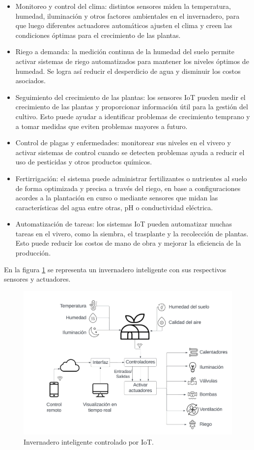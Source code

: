 \begin{itemize}
	\item Monitoreo y control del clima: distintos sensores miden la temperatura, humedad, iluminación y otros factores ambientales en el invernadero, para que luego diferentes actuadores automáticos ajusten el clima y creen las condiciones óptimas para el crecimiento de las plantas.

    \item Riego a demanda: la medición continua de la humedad del suelo permite activar sistemas de riego automatizados para mantener los niveles óptimos de humedad. Se logra así reducir el desperdicio de agua y disminuir los costos asociados.

    \item Seguimiento del crecimiento de las plantas: los sensores IoT pueden medir el crecimiento de las plantas y proporcionar información útil para la gestión del cultivo. Esto puede ayudar a identificar problemas de crecimiento temprano y a tomar medidas que eviten problemas mayores a futuro.

    \item Control de plagas y enfermedades: monitorear sus niveles en el vivero y activar sistemas de control cuando se detecten problemas ayuda a reducir el uso de pesticidas y otros productos químicos.
    
   \item  Fertirrigación: el sistema puede administrar fertilizantes o nutrientes al suelo de forma optimizada y precisa a través del riego, en base a configuraciones acordes a la plantación en curso o mediante sensores que midan las características del agua entre otras, pH o conductividad eléctrica.

    \item Automatización de tareas: los sistemas IoT pueden automatizar muchas tareas en el vivero, como la siembra, el trasplante y la recolección de plantas. Esto puede reducir los costos de mano de obra y mejorar la eficiencia de la producción.
\end{itemize}    

En la figura \ref{fig:imgInvernaderoInteligente} se representa un invernadero inteligente con sus respectivos sensores y actuadores.

\begin{figure}[htpb]
\centering 
\includegraphics[width=.7\textwidth]{../Figures/SmartGreenhouse.jpeg}
\caption[Invernadero inteligente controlado por IoT]{Invernadero inteligente controlado por IoT\protect\footnotemark.}
\label{fig:imgInvernaderoInteligente}
\end{figure}

